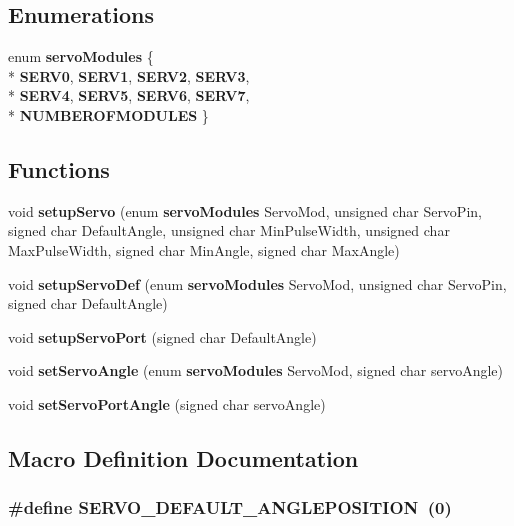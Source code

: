 \subsection*{Enumerations}
\begin{DoxyCompactItemize}
\item 
enum {\bf servo\-Modules} \{ \\*
{\bf S\-E\-R\-V0}, 
{\bf S\-E\-R\-V1}, 
{\bf S\-E\-R\-V2}, 
{\bf S\-E\-R\-V3}, 
\\*
{\bf S\-E\-R\-V4}, 
{\bf S\-E\-R\-V5}, 
{\bf S\-E\-R\-V6}, 
{\bf S\-E\-R\-V7}, 
\\*
{\bf N\-U\-M\-B\-E\-R\-O\-F\-M\-O\-D\-U\-L\-E\-S}
 \}
\end{DoxyCompactItemize}
\subsection*{Functions}
\begin{DoxyCompactItemize}
\item 
void {\bf setup\-Servo} (enum {\bf servo\-Modules} Servo\-Mod, unsigned char Servo\-Pin, signed char Default\-Angle, unsigned char Min\-Pulse\-Width, unsigned char Max\-Pulse\-Width, signed char Min\-Angle, signed char Max\-Angle)
\item 
void {\bf setup\-Servo\-Def} (enum {\bf servo\-Modules} Servo\-Mod, unsigned char Servo\-Pin, signed char Default\-Angle)
\item 
void {\bf setup\-Servo\-Port} (signed char Default\-Angle)
\item 
void {\bf set\-Servo\-Angle} (enum {\bf servo\-Modules} Servo\-Mod, signed char servo\-Angle)
\item 
void {\bf set\-Servo\-Port\-Angle} (signed char servo\-Angle)
\end{DoxyCompactItemize}


\subsection{Macro Definition Documentation}
\subsubsection[{S\-E\-R\-V\-O\-\_\-\-D\-E\-F\-A\-U\-L\-T\-\_\-\-A\-N\-G\-L\-E\-P\-O\-S\-I\-T\-I\-O\-N}]{\setlength{\rightskip}{0pt plus 5cm}\#define S\-E\-R\-V\-O\-\_\-\-D\-E\-F\-A\-U\-L\-T\-\_\-\-A\-N\-G\-L\-E\-P\-O\-S\-I\-T\-I\-O\-N~(0)}\label{servo_8h_a03fa267da3c796be766ac00fd31fcba4}


